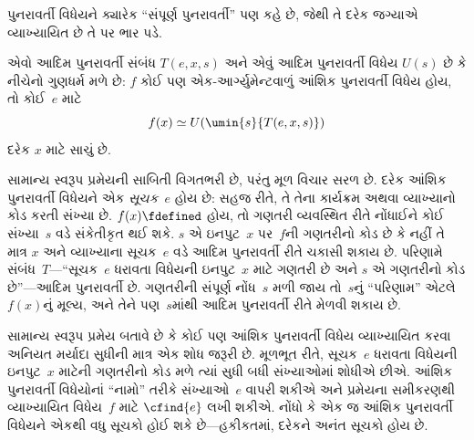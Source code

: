 પુનરાવર્તી વિધેયને ક્યારેક ``સંપૂર્ણ પુનરાવર્તી'' પણ કહે છે,
જેથી તે દરેક જગ્યાએ વ્યાખ્યાયિત છે તે પર ભાર પડે.
\endgroup


\begingroup
\makeatletter{}\makeatother

\label{guunit:OLP-0225}


\begin{thm}[ક્લીનીનું સામાન્ય સ્વરૂપ પ્રમેય]
એવો આદિમ પુનરાવર્તી સંબંધ $T(e, x, s)$ અને એવું આદિમ
પુનરાવર્તી વિધેય $U(s)$ છે કે નીચેનો ગુણધર્મ મળે છે: $f$ કોઈ પણ
એક-આર્ગ્યુમેન્ટવાળું આંશિક પુનરાવર્તી વિધેય હોય, તો કોઈ~$e$ માટે
\[
f(x) \simeq U(\umin{s}{T(e, x, s)})
\]
દરેક $x$ માટે સાચું છે.
\end{thm}

\begin{explain}
સામાન્ય સ્વરૂપ પ્રમેયની સાબિતી વિગતભરી છે, પરંતુ મૂળ વિચાર સરળ
છે. દરેક આંશિક પુનરાવર્તી વિધેયને એક \emph{સૂચક}~$e$ હોય છે:
સહજ રીતે, તે તેના કાર્યક્રમ અથવા વ્યાખ્યાનો કોડ કરતી સંખ્યા છે.
$f(x)
\fdefined$ હોય, તો ગણતરી વ્યવસ્થિત રીતે નોંધાઈને કોઈ સંખ્યા~$s$
વડે સંકેતીકૃત થઈ શકે. $s$ એ ઇનપુટ~$x$ પર~$f$ની ગણતરીનો કોડ
છે કે નહીં તે માત્ર $x$ અને વ્યાખ્યાના સૂચક~$e$ વડે આદિમ
પુનરાવર્તી રીતે ચકાસી શકાય છે. પરિણામે સંબંધ~$T$---``સૂચક~$e$
ધરાવતા વિધેયની ઇનપુટ~$x$ માટે ગણતરી છે અને $s$ એ ગણતરીનો
કોડ છે''---આદિમ પુનરાવર્તી છે. ગણતરીની સંપૂર્ણ નોંધ~$s$ મળી જાય
તો~$s$નું ``પરિણામ'' એટલે~$f(x)$નું મૂલ્ય, અને તેને પણ~$s$માંથી
આદિમ પુનરાવર્તી રીતે મેળવી શકાય છે.

સામાન્ય સ્વરૂપ પ્રમેય બતાવે છે કે કોઈ પણ આંશિક પુનરાવર્તી વિધેય
વ્યાખ્યાયિત કરવા અનિયત મર્યાદા સુધીની માત્ર એક શોધ જરૂરી છે.
મૂળભૂત રીતે, સૂચક~$e$ ધરાવતા વિધેયની ઇનપુટ~$x$ માટેની ગણતરીનો
કોડ મળે ત્યાં સુધી બધી સંખ્યાઓમાં શોધીએ છીએ. આંશિક પુનરાવર્તી
વિધેયોનાં ``નામો'' તરીકે સંખ્યાઓ~$e$ વાપરી શકીએ અને પ્રમેયના
સમીકરણથી વ્યાખ્યાયિત વિધેય~$f$ માટે $\cfind{e}$ લખી શકીએ.
નોંધો કે એક જ આંશિક પુનરાવર્તી વિધેયને એકથી વધુ સૂચકો હોઈ શકે
છે---હકીકતમાં, દરેકને અનંત સૂચકો હોય છે.
\end{explain}
\endgroup


\begingroup
\makeatletter{}\makeatother

